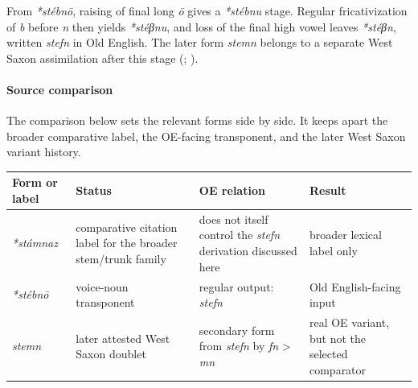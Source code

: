 \documentclass[
  british,
  a4paper,
]{article}
\newcounter{none} %
\begin{document}
From \emph{*stébnō}, raising of final long \emph{ō} gives a
\emph{*stébnu} stage. Regular fricativization of \emph{b} before
\emph{n} then yields \emph{*stéβnu}, and loss of the final high vowel
leaves \emph{*stéβn}, written \emph{stefn} in Old English. The later
form \emph{stemn} belongs to a separate West Saxon assimilation after
this stage (;
).

\paragraph{Source comparison}\label{source-comparison}

The comparison below sets the relevant forms side by side. It keeps
apart the broader comparative label, the OE-facing transponent, and the
later West Saxon variant history.

{\def\LTcaptype{none} %
\begin{longtable}[]{@{}
  >{\raggedright\arraybackslash}p{}
  >{\raggedright\arraybackslash}p{}
  >{\raggedright\arraybackslash}p{}
  >{\raggedright\arraybackslash}p{}@{}}
\toprule\noalign{}
\begin{minipage}[b]{\linewidth}\raggedright
Form or label
\end{minipage} & \begin{minipage}[b]{\linewidth}\raggedright
Status
\end{minipage} & \begin{minipage}[b]{\linewidth}\raggedright
OE relation
\end{minipage} & \begin{minipage}[b]{\linewidth}\raggedright
Result
\end{minipage} \\
\midrule\noalign{}
\endhead
\bottomrule\noalign{}
\endlastfoot
\emph{*stámnaz} & comparative citation label for the broader stem/trunk
family & does not itself control the \emph{stefn} derivation discussed
here & broader lexical label only \\
\emph{*stébnō} & voice-noun transponent & regular output: \emph{stefn} &
Old English-facing input \\
\emph{stemn} & later attested West Saxon doublet & secondary form from
\emph{stefn} by \emph{fn} \textgreater{} \emph{mn} & real OE variant,
but not the selected comparator \\
\end{longtable}
}
\end{document}
